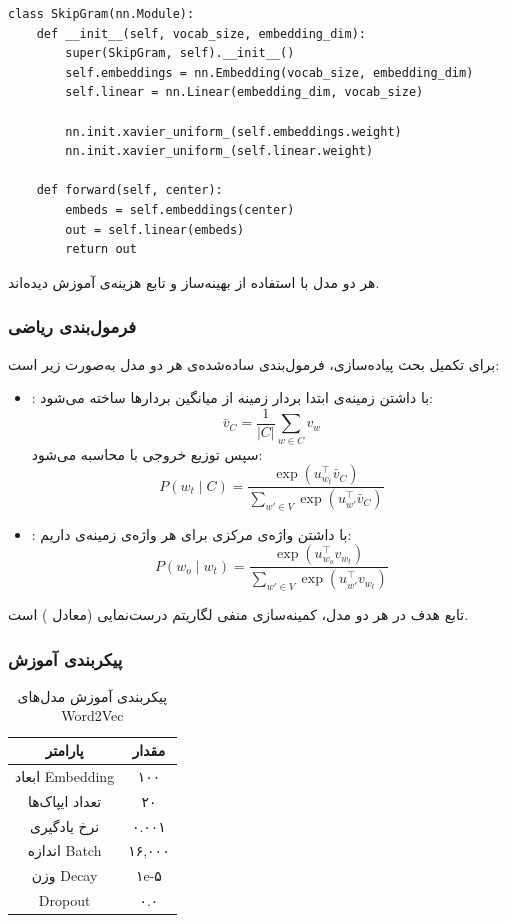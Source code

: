 \documentclass[12pt,a4paper]{article}
\begin{document}
\begin{lstlisting}[caption=کد مدل Skip-Gram]
class SkipGram(nn.Module):
    def __init__(self, vocab_size, embedding_dim):
        super(SkipGram, self).__init__()
        self.embeddings = nn.Embedding(vocab_size, embedding_dim)
        self.linear = nn.Linear(embedding_dim, vocab_size)

        nn.init.xavier_uniform_(self.embeddings.weight)
        nn.init.xavier_uniform_(self.linear.weight)

    def forward(self, center):
        embeds = self.embeddings(center)
        out = self.linear(embeds)
        return out
\end{lstlisting}

هر دو مدل با استفاده از بهینه‌ساز  و تابع هزینه‌ی  آموزش دیده‌اند.

\subsubsection{فرمول‌بندی ریاضی}
برای تکمیل بحث پیاده‌سازی، فرمول‌بندی ساده‌شده‌ی هر دو مدل به‌صورت زیر است:
\begin{itemize}
\item \textbf{}: با داشتن زمینه‌ی  ابتدا بردار زمینه از میانگین بردارها ساخته می‌شود:
\begin{equation}
\bar{v}_C = \frac{1}{|C|}\sum_{w \in C} v_w
\end{equation}
سپس توزیع خروجی با  محاسبه می‌شود:
\begin{equation}
P(w_t \mid C) = \frac{\exp(u_{w_t}^{\top}\bar{v}_C)}{\sum_{w' \in V}\exp(u_{w'}^{\top}\bar{v}_C)}
\end{equation}
\item \textbf{}: با داشتن واژه‌ی مرکزی  برای هر واژه‌ی زمینه‌ی  داریم:
\begin{equation}
P(w_o \mid w_t) = \frac{\exp(u_{w_o}^{\top}v_{w_t})}{\sum_{w' \in V}\exp(u_{w'}^{\top}v_{w_t})}
\end{equation}
\end{itemize}
تابع هدف در هر دو مدل، کمینه‌سازی منفی لگاریتم درست‌نمایی (معادل ) است.

\subsubsection{پیکربندی آموزش}
\begin{table}[H]
\centering
\begin{tabular}{|c|c|}
\hline
\textbf{پارامتر} & \textbf{مقدار} \\
\hline
ابعاد Embedding & ۱۰۰ \\
تعداد ایپاک‌ها & ۲۰ \\
نرخ یادگیری & ۰.۰۰۱ \\
اندازه Batch & ۱۶,۰۰۰ \\
وزن Decay & ۱e-۵ \\
Dropout & ۰.۰ \\
\hline
\end{tabular}
\caption{پیکربندی آموزش مدل‌های Word2Vec}
\end{table}
\end{document}
